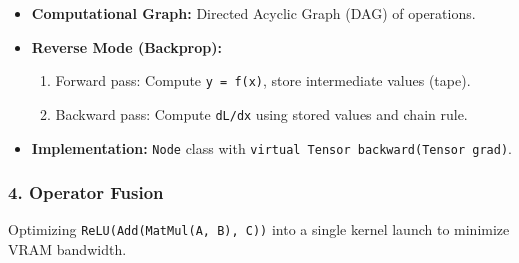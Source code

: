 \begin{itemize}
\tightlist
\item
  \textbf{Computational Graph:} Directed Acyclic Graph (DAG) of
  operations.
\item
  \textbf{Reverse Mode (Backprop):}

  \begin{enumerate}
  \def\labelenumi{\arabic{enumi}.}
  \tightlist
  \item
    Forward pass: Compute \passthrough{\lstinline!y = f(x)!}, store
    intermediate values (tape).
  \item
    Backward pass: Compute \passthrough{\lstinline!dL/dx!} using stored
    values and chain rule.
  \end{enumerate}
\item
  \textbf{Implementation:} \passthrough{\lstinline!Node!} class with
  \passthrough{\lstinline!virtual Tensor backward(Tensor grad)!}.
\end{itemize}

\hypertarget{operator-fusion}{%
\subsubsection{4. Operator Fusion}\label{operator-fusion}}

Optimizing \passthrough{\lstinline!ReLU(Add(MatMul(A, B), C))!} into a
single kernel launch to minimize VRAM bandwidth.
